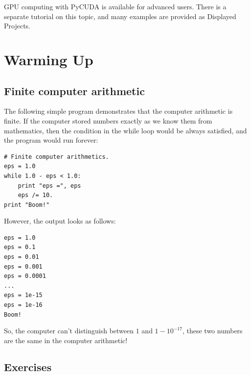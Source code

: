 \documentclass{article}
\begin{document}
GPU computing with PyCUDA is available for advanced users. There
is a separate tutorial on this topic, and many examples are provided
as Displayed Projects.


\newpage


\section{Warming Up}



\subsection{Finite computer arithmetic}

The following simple program demonstrates that the computer 
arithmetic is finite. If the computer stored numbers exactly 
as we know them from mathematics, then the condition in the while 
loop would be always satisfied, and the program would run forever:

\begin{verbatim}
# Finite computer arithmetics.
eps = 1.0
while 1.0 - eps < 1.0:
    print "eps =", eps
    eps /= 10.
print "Boom!"
\end{verbatim}
However, the output looks as follows:

\begin{verbatim}
eps = 1.0
eps = 0.1
eps = 0.01
eps = 0.001
eps = 0.0001
...
eps = 1e-15
eps = 1e-16
Boom!
\end{verbatim}
\noindent
So, the computer can't distinguish between $1$ and $1 - 10^{-17}$, these two numbers 
are the same in the computer arithmetic!

\subsection{Exercises}
\end{document}
